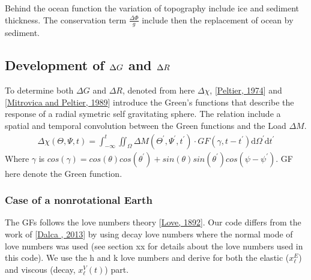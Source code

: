 \documentclass[letterpaper,10pt,english]{sphinxmanual}
\begin{document}
\sphinxAtStartPar
Behind the ocean function the variation of topography include ice and sediment thickness. The conservation term \(\frac{\Delta \Phi}{g}\) include then the replacement of ocean by sediment.


\subsection{Development of \protect\(\Delta G\protect\) and \protect\(\Delta R\protect\)}
\label{\detokenize{Theory:development-of-delta-g-and-delta-r}}\label{\detokenize{Theory:geoid-ground-variation-theory}}
\sphinxAtStartPar
To determine both \(\Delta G\) and \(\Delta R\), denoted from here \(\Delta \chi\), {[}\hyperlink{cite.index:id10}{Peltier, 1974}{]} and {[}\hyperlink{cite.index:id9}{Mitrovica and Peltier, 1989}{]} introduce the Green’s functions that describe the response of a radial symetric self gravitating sphere. The relation include a spatial and temporal convolution between the Green functions and the Load \(\Delta M\).
\begin{equation*}
\begin{split}\Delta \chi (\Theta,\Psi,t)=\int_{-\infty}^t \iint_{\Omega} \Delta M\left(\Theta^{\prime}, \Psi^{\prime}, t^{\prime}\right) \cdot G F\left(\gamma, t-t^{\prime}\right) \mathrm{d} \Omega^{\prime} \mathrm{d} t^{\prime}\end{split}
\end{equation*}
\sphinxAtStartPar
Where \(\gamma\) is \(cos(\gamma) = cos(\theta)cos(\theta^{\prime}) + sin(\theta)sin(\theta^{\prime})cos(\psi-\psi^{\prime})\). GF here denote the Green function.


\subsubsection{Case of a non\sphinxhyphen{}rotational Earth}
\label{\detokenize{Theory:case-of-a-non-rotational-earth}}
\sphinxAtStartPar
The GFs follows the love numbers theory {[}\hyperlink{cite.index:id6}{Love, 1892}{]}. Our code differs from the work of {[}\hyperlink{cite.index:id3}{Dalca , 2013}{]} by using decay love numbers where the normal mode of love numbers was used (see section xx for details about the love numbers used in this code). We use the h and k love numbers and derive for both the elastic (\(x_{\ell}^E\)) and viscous (decay, \(x_{\ell}^V(t)\)) part.
\end{document}
